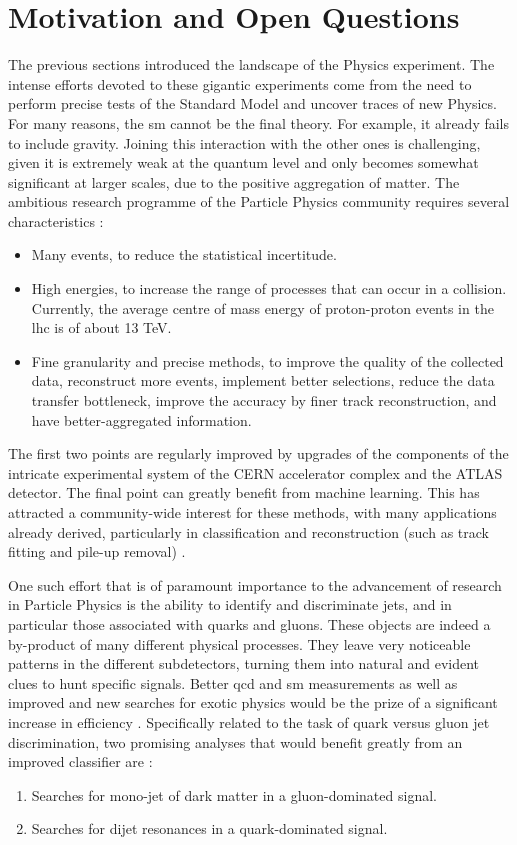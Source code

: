 \section{Motivation and Open Questions}\label{Section:Mot}
The previous sections introduced the landscape of the Physics experiment. The intense efforts devoted to these gigantic experiments come from the need to perform precise tests of the Standard Model and uncover traces of new Physics. For many reasons, the \gls{sm} cannot be the final theory. For example, it already fails to include gravity. Joining this interaction with the other ones is challenging, given it is extremely weak at the quantum level and only becomes somewhat significant at larger scales, due to the positive aggregation of matter. The ambitious research programme of the Particle Physics community requires several characteristics \cite{BSM_HL_LHC}: 
\begin{itemize}
\item Many events, to reduce the statistical incertitude.
\item High energies, to increase the range of processes that can occur in a collision. Currently, the average centre of mass energy of proton-proton events in the \gls{lhc} is of about 13 TeV. 
\item Fine granularity and precise methods, to improve the quality of the collected data, reconstruct more events, implement better selections, reduce the data transfer bottleneck, improve the accuracy by finer track reconstruction, and have better-aggregated information.
\end{itemize}
The first two points are regularly improved by upgrades of the components of the intricate experimental system of the CERN accelerator complex and the ATLAS detector. The final point can greatly benefit from machine learning. This has attracted a community-wide interest for these methods, with many applications already derived, particularly in classification and reconstruction (such as track fitting and pile-up removal) \cite{Deep_Learning_HEP}. 

One such effort that is of paramount importance to the advancement of research in Particle Physics is the ability to identify and discriminate jets, and in particular those associated with quarks and gluons. These objects are indeed a by-product of many different physical processes. They leave very noticeable patterns in the different subdetectors, turning them into natural and evident clues to hunt specific signals. Better \gls{qcd} and \gls{sm} measurements as well as improved and new searches for exotic physics would be the prize of a significant increase in efficiency \cite{Search_HEP_Deep_Learning}. Specifically related to the task of quark versus gluon jet discrimination, two promising analyses that would benefit greatly from an improved classifier are \cite{QG_ML_vs_Detector}:
\begin{enumerate}
\item Searches for mono-jet of dark matter in a gluon-dominated signal.
\item Searches for dijet resonances in a quark-dominated signal.
\end{enumerate}

